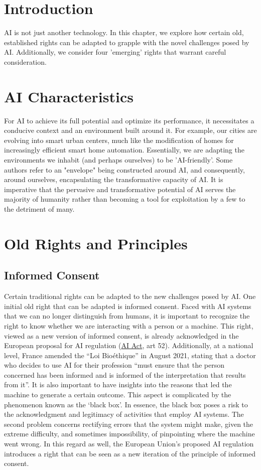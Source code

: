 \section{Introduction}
AI is not just another technology. In this chapter, we explore how certain old, established rights can be adapted to grapple with the novel challenges posed by AI. Additionally, we consider four 'emerging' rights that warrant careful consideration.

\section{AI Characteristics}
For AI to achieve its full potential and optimize its performance, it necessitates a conducive context and an environment built around it. For example, our cities are evolving into smart urban centers, much like the modification of homes for increasingly efficient smart home automation. Essentially, we are adapting the environments we inhabit (and perhaps ourselves) to be 'AI-friendly'. Some authors refer to an "envelope" being constructed around AI, and consequently, around ourselves, encapsulating the transformative capacity of AI. It is imperative that the pervasive and transformative potential of AI serves the majority of humanity rather than becoming a tool for exploitation by a few to the detriment of many.

\section{Old Rights and Principles}
\subsection{Informed Consent}
Certain traditional rights can be adapted to the new challenges posed by AI. One initial old right that can be adapted is informed consent. Faced with AI systems that we can no longer distinguish from humans, it is important to recognize the right to know whether we are interacting with a person or a machine. This right, viewed as a new version of informed consent, is already acknowledged in the European proposal for AI regulation (\hyperref[sec:AIAct]{AI Act}, art 52). Additionally, at a national level, France amended the “Loi Bioéthique” in August 2021, stating that a doctor who decides to use AI for their profession “must ensure that the person concerned has been informed and is informed of the interpretation that results from it”. It is also important to have insights into the reasons that led the machine to generate a certain outcome. This aspect is complicated by the phenomenon known as the ‘black box’. In essence, the black box poses a risk to the acknowledgment and legitimacy of activities that employ AI systems. The second problem concerns rectifying errors that the system might make, given the extreme difficulty, and sometimes impossibility, of pinpointing where the machine went wrong. In this regard as well, the European Union’s proposed AI regulation introduces a right that can be seen as a new iteration of the principle of informed consent.

